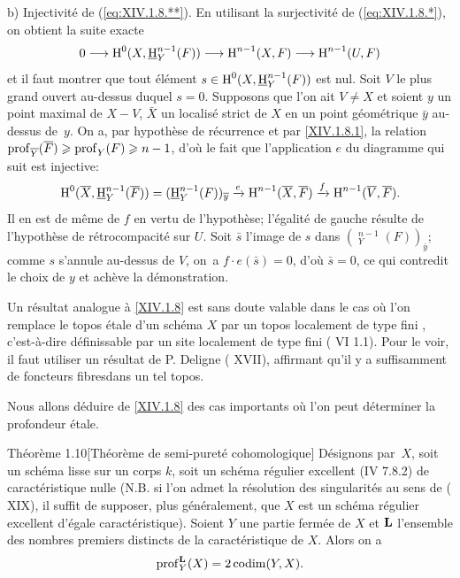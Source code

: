b) Injectivit\'e de (\ref{eq:XIV.1.8.**}). En utilisant la surjectivit\'e de (\ref{eq:XIV.1.8.*}), on obtient la suite exacte
$$0\to \H^0(X, {\mathop{\underline{\mathrm{H}}}\nolimits}_Y^{n-1}(F))\to \H^{n-1}(X, F)\to \H^{n-1}(U, F)$$
et il faut montrer que tout \'el\'ement $s\in \operatorname{H}^0(X, {\mathop{\underline{\mathrm{H}}}\nolimits}_Y^{n-1}(F))$ est nul. Soit $V$ le plus grand ouvert au-dessus duquel $s=0$. Supposons que l'on ait $V\neq X$ et soient $y$ un point maximal de $X-V$, $\bar X$ un localis\'e strict de $X$ en un point g\'eom\'etrique $\bar y$ au-dessus de~$y$. On a, par hypoth\`ese de r\'ecurrence et par \ref{XIV.1.8.1}, la relation $\operatorname{prof}_{\overline Y}(\overline F)\geqslant \operatorname{prof}_Y(F)\geqslant n-1$, d'o\`u le fait que l'application $e$ du diagramme qui suit est injective:
$$
\operatorname{H}^0(\overline X, {\mathop{\underline{\mathrm{H}}}\nolimits}_Y^{n-1}(\overline F))= ({\mathop{\underline{\mathrm{H}}}\nolimits}_Y^{n-1}(F))_{\overline y}\xrightarrow{e} \operatorname{H}^{n-1}(\overline X, \overline F) \xrightarrow{f} \operatorname{H}^{n-1}(\overline V, \overline F).
$$
Il en est de m\^eme de $f$ en vertu de l'hypoth\`ese; l'\'egalit\'e de gauche r\'esulte de l'hypoth\`ese de r\'etrocompacit\'e sur $U$. Soit $\bar s$ l'image de $s$ dans $({\mathop{\underline{\mathrm{H}}}\nolimits}_Y^{n-1}(F))_{\bar y}$; comme $s$ s'annule au-dessus de $V$, on~a $f\cdot e(\bar s)=0$, d'o\`u $\bar s=0$, ce qui contredit le choix de $y$ et ach\`eve la d\'emonstration.

\begin{remarque} \label{XIV.1.9}
Un r\'esultat analogue \`a \ref{XIV.1.8} est sans doute valable dans le cas o\`u l'on remplace le topos \'etale d'un sch\'ema $X$ par un \og topos localement de type fini \fg, c'est-\`a-dire d\'efinissable par un site localement de type fini ( VI 1.1). Pour le voir, il faut utiliser un r\'esultat de P. Deligne ( XVII), affirmant qu'il y a \og suffisamment de foncteurs fibres\fg dans un tel topos.
\end{remarque}

Nous allons d\'eduire de \ref{XIV.1.8} des cas importants o\`u l'on peut d\'eterminer la profondeur \'etale.

\label{XIV.1.10}
\begin{enonce*}{Th\'eor\`eme 1.10}[Th\'eor\`eme de semi-puret\'e cohomologique\ndemark]
D\'esignons par~$X$, soit un sch\'ema lisse sur un corps $k$, soit un sch\'ema r\'egulier excellent \textup{(\EGA IV 7.8.2)} de caract\'eristique nulle (N.B. si l'on admet la r\'esolution des singularit\'es au sens de \textup{( XIX)}, il suffit de supposer, plus g\'en\'eralement, que $X$ est un sch\'ema r\'egulier excellent d'\'egale caract\'eristique). Soient $Y$ une partie ferm\'ee de $X$ et $\mathbf{L}$ l'ensemble des nombres premiers distincts de la caract\'eristique de $X$. Alors on a
$$
\operatorname{prof}_Y^{\mathbf{L}}(X)=2\operatorname{codim}(Y, X).
$$
\end{enonce*}

